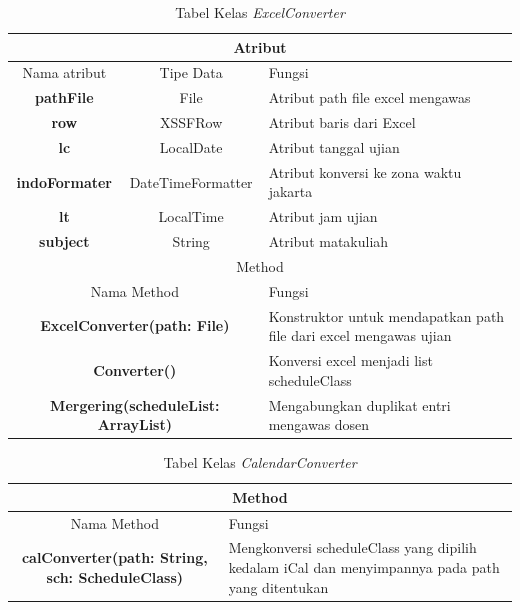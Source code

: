 \begin{table}[H]
	\centering
		\caption{Tabel Kelas \textit{ExcelConverter}}
		\label{tab:excel_converter}
		\begin{tabular}{ | c | c | p{4cm} |}
			\hline
				\multicolumn{3}{|c|}{Atribut} \\ \hline 
				Nama atribut & Tipe Data  & Fungsi \\ \hline
				\textbf{pathFile} & File & Atribut path file excel mengawas\\ \hline
				\textbf{row} & XSSFRow & Atribut baris dari Excel\\ \hline
				\textbf{lc} & LocalDate & Atribut tanggal ujian\\ \hline
				\textbf{indoFormater} & DateTimeFormatter & Atribut konversi ke zona waktu jakarta\\ \hline
				\textbf{lt} & LocalTime & Atribut jam ujian\\ \hline
				\textbf{subject} & String & Atribut matakuliah\\ \hline
				\multicolumn{3}{|c|}{Method} \\ \hline
				\multicolumn{2}{|c|}{Nama Method} & Fungsi \\ \hline
				\multicolumn{2}{|c|}{\textbf{ExcelConverter(path: File)}} & Konstruktor untuk mendapatkan path file dari excel mengawas ujian\\ \hline
				\multicolumn{2}{|c|}{\textbf{Converter()}} & Konversi excel menjadi list scheduleClass \\ \hline
				\multicolumn{2}{|c|}{\textbf{Mergering(scheduleList: ArrayList)}} & Mengabungkan duplikat entri mengawas dosen \\ \hline
		\end{tabular}
\end{table}

\begin{table}[H]
	\centering
		\caption{Tabel Kelas \textit{CalendarConverter}}
		\label{tab:excel_converter}
		\begin{tabular}{ | c | c | p{4cm} |}
			\hline
				\multicolumn{3}{|c|}{Method}\\ \hline
				\multicolumn{2}{|c|}{Nama Method} & Fungsi \\ \hline
				\multicolumn{2}{|c|}{\textbf{calConverter(path: String, sch: ScheduleClass)}} & Mengkonversi scheduleClass yang dipilih kedalam iCal dan menyimpannya pada path yang ditentukan\\ \hline
		\end{tabular}
\end{table}

